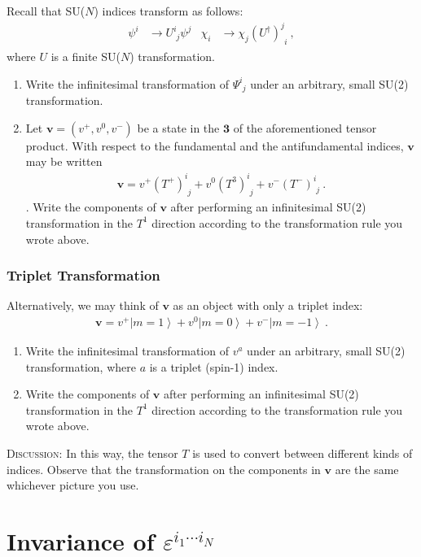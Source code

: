 \documentclass[12pt]{article}
\numberwithin{equation}{subsection}    %
\renewcommand{\vec}[1]{\mathbf{#1}} %
\newcommand{\ket}[1]{\left|#1\right\rangle}    %
\begin{document}
Recall that SU($N$) indices transform as follows:
\begin{align}
  \psi^i &\to U^i_{\phantom{i}j} \psi ^j
  &
  \chi_i &\to  \chi_j (U^\dag)^j_{\phantom{j}i} \ ,
\end{align}
where $U$ is a finite SU($N$) transformation.

\begin{enumerate}
  \item Write the infinitesimal transformation of $\Psi^i_{\phantom{i}j}$ under an arbitrary, small SU(2) transformation.
  \item Let $\vec{v} = (v^+, v^0, v^-)$ be a state in the $\mathbf{3}$ of the aforementioned tensor product. With respect to the fundamental and the antifundamental indices, $\mathbf{v}$ may be written
  \begin{align}
    \vec{v} = v^+ (T^+)^i_{\phantom{i}j} + v^0 (T^3)^i_{\phantom{i}j} + v^- (T^-)^i_{\phantom{i}j} \ .
  \end{align}.
  Write the components of $\vec{v}$ after performing an infinitesimal SU(2) transformation in the $T^1$ direction according to the transformation rule you wrote above.
\end{enumerate}

\subsubsection{Triplet Transformation}
Alternatively, we may think of $\vec{v}$ as an object with only a triplet index:
\begin{align}
  \vec{v} = v^+ \ket{m=1} + v^0 \ket{m=0} + v^- \ket{m=-1} \ .
\end{align}
\begin{enumerate}
  \item Write the infinitesimal transformation of $v^a$ under an arbitrary, small SU(2) transformation, where $a$ is a triplet (spin-1) index.
  \item Write the components of $\vec{v}$ after performing an infinitesimal SU(2) transformation in the $T^1$ direction according to the transformation rule you wrote above.
\end{enumerate}

\textsc{Discussion}: In this way, the tensor $T$ is used to convert between different kinds of indices. Observe that the transformation on the components in $\vec{v}$ are the same whichever picture you use.


\section{Invariance of $\varepsilon^{i_1\cdots i_N}$}
\end{document}
